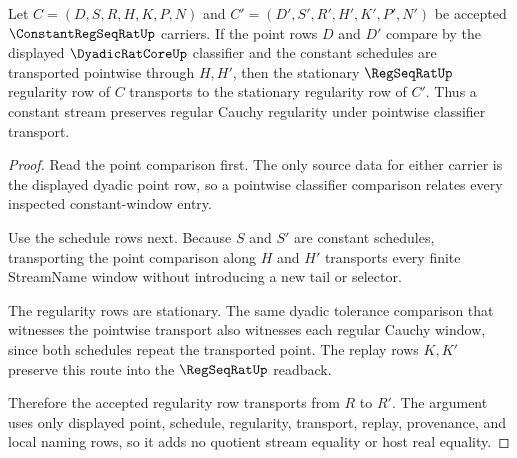 \begin{theorem}
\label{thm:constant-regseqrat-regularity-stability}
Let $C=(D,S,R,H,K,P,N)$ and $C'=(D',S',R',H',K',P',N')$ be accepted $\ConstantRegSeqRatUp$ carriers. If the point rows $D$ and $D'$ compare by the displayed $\DyadicRatCoreUp$ classifier and the constant schedules are transported pointwise through $H,H'$, then the stationary $\RegSeqRatUp$ regularity row of $C$ transports to the stationary regularity row of $C'$. Thus a constant stream preserves regular Cauchy regularity under pointwise classifier transport.
\end{theorem}
\begin{proof}
Read the point comparison first. The only source data for either carrier is the displayed dyadic point row, so a pointwise classifier comparison relates every inspected constant-window entry.

Use the schedule rows next. Because $S$ and $S'$ are constant schedules, transporting the point comparison along $H$ and $H'$ transports every finite StreamName window without introducing a new tail or selector.

The regularity rows are stationary. The same dyadic tolerance comparison that witnesses the pointwise transport also witnesses each regular Cauchy window, since both schedules repeat the transported point. The replay rows $K,K'$ preserve this route into the $\RegSeqRatUp$ readback.

Therefore the accepted regularity row transports from $R$ to $R'$. The argument uses only displayed point, schedule, regularity, transport, replay, provenance, and local naming rows, so it adds no quotient stream equality or host real equality.
\end{proof}

